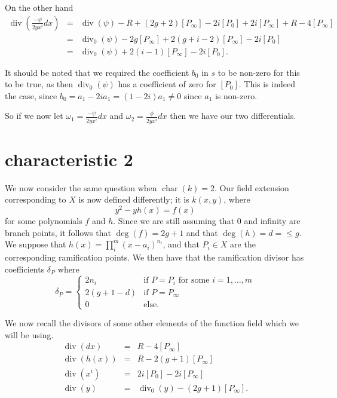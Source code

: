 \documentclass[draft, 11pt]{article} %
\theoremstyle{plain}
\theoremstyle{remark}
\DeclareMathOperator{\di}{div}
\DeclareMathOperator{\cha}{char}
\begin{document}
On the other hand
\begin{eqnarray*}
\di \left( \frac{-\psi}{2yx^i}dx\right) & = & \di (\psi ) -R + (2g+2)[P_\infty] - 2i[P_0] + 2i[P_\infty] + R -4[P_\infty] \\
& = & \di_0(\psi) - 2g[P_\infty] + 2(g+i-2)[P_\infty] -2i[P_0] \\
& = & \di_0(\psi) + 2(i-1)[P_\infty] - 2i[P_0].
\end{eqnarray*}

It should be noted that we required the coefficient $b_0$ in $s$ to be non-zero for this to be true, as then $\di_0(\psi)$ has a coefficient of zero for $[P_0]$. This is indeed the case, since $b_0 = a_1 - 2ia_1 = (1-2i)a_1 \neq 0$ since $a_1$ is non-zero. 


So if we now let $\omega_1 = \frac{-\psi}{2yx^i}dx$ and $\omega_2 = \frac{\phi}{2yx^i}dx$ then we have our two differentials.

\newpage

\section{characteristic 2}

We now consider the same question when $\cha (k) = 2$.
Our field extension corresponding to $X$ is now defined differently; it is $k(x,y)$, where
\[
y^2 - yh(x) = f(x)
\]
for some polynomials $f$ and $h$.
Since we are still assuming that $0$ and infinity are branch points, it follows that $\deg(f) = 2g+1$ and that $\deg(h)  = d = \leq g$. 
We suppose that $h(x) = \prod_i^m (x-a_i)^{n_i}$, and that $P_i\in X$ are the corresponding ramification points.
We then have that the ramification divisor has coefficients $\delta_P$ where
\[
\delta_P = \left \{ \begin{array}{ll}
2n_i & \text{if } P= P_i \text{ for some } i=1, \ldots , m \\
2(g+1-d) & \text{if } P=P_\infty \\
0 & \text{else.}
\end{array}
\right.
\]


We now recall the divisors of some other elements of the function field which we will be using.
\begin{eqnarray*}
\di (dx) & = & R - 4[P_\infty] \\
\di (h(x)) & = & R - 2(g+1)[P_\infty] \\
\di (x^i) & = & 2i[P_0] - 2i[P_\infty]\\
\di (y) & = & \di_0(y) - (2g+1)[P_\infty].
\end{eqnarray*}
\end{document}
